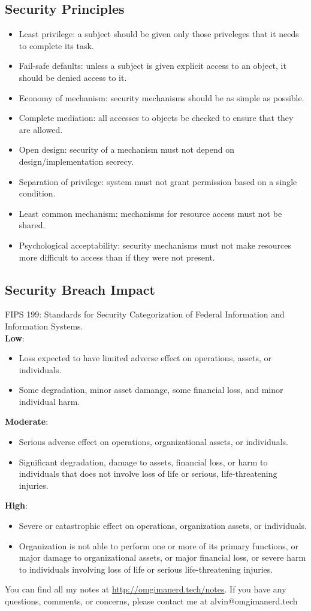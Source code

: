 \documentclass{math}
\begin{document}
\subsection*{Security Principles}
\begin{itemize}
  \item Least privilege: a subject should be given only those priveleges that it
  needs to complete its task.
  \item Fail-safe defaults: unless a subject is given explicit access to an
  object, it should be denied access to it.
  \item Economy of mechanism: security mechanisms should be as simple as
  possible.
  \item Complete mediation: all accesses to objects be checked to ensure that
  they are allowed.
  \item Open design: security of a mechanism must not depend on
  design/implementation secrecy.
  \item Separation of privilege: system must not grant permission based on a
  single condition.
  \item Least common mechanism: mechanisms for resource access must not be
  shared.
  \item Psychological acceptability: security mechanisms must not make resources
  more difficult to access than if they were not present.
\end{itemize}

\subsection*{Security Breach Impact}
FIPS 199: Standards for Security Categorization of Federal Information and
Information Systems. \\
\textbf{Low}:
\begin{itemize}
  \item Loss expected to have limited adverse effect on operations, assets, or
  individuals.
  \item Some degradation, minor asset damange, some financial loss, and minor
  individual harm.
\end{itemize}
\textbf{Moderate}:
\begin{itemize}
  \item Serious adverse effect on operations, organizational assets, or
  individuals.
  \item Significant degradation, damage to assets, financial loss, or harm to
  individuals that does not involve loss of life or serious, life-threatening
  injuries.
\end{itemize}
\textbf{High}:
\begin{itemize}
  \item Severe or catastrophic effect on operations, organization assets, or
  individuals.
  \item Organization is not able to perform one or more of its primary
  functions, or major damage to organizational assets, or major financial loss,
  or severe harm to individuals involving loss of life or serious
  life-threatening injuries.
\end{itemize}

\begin{center}
  You can find all my notes at \url{http://omgimanerd.tech/notes}. If you have
  any questions, comments, or concerns, please contact me at
  alvin@omgimanerd.tech
\end{center}
\end{document}
